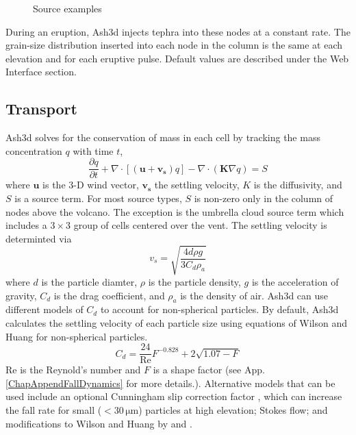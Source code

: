 \begin{figure}[htbp]
\parbox{15cm}{\caption{\label{FigSourceExample}
Source examples}}
\end{figure}

During an eruption, Ash3d injects tephra into these nodes at a constant
rate. The grain-size distribution inserted into each node in the column
is the same at each elevation and for each eruptive pulse. Default values
are described under the Web Interface section.

\subsection{Transport}\label{ChapIntroSecTrans}
Ash3d solves for the conservation of mass in each cell by tracking the mass
concentration $q$ with time $t$,
\begin{equation}\label{EqGovEqVect}
 \frac{\partial q}{\partial t} +
   \nabla \cdot \left[ \left(\mathbf{u} + \mathbf{v_s} \right) q \right]
 - \nabla \cdot \left( \mathbf{K} \nabla q\right) = S
\end{equation}
where $\mathbf{u}$ is the 3-D wind vector,
$\mathbf{v_s}$ the settling velocity, $K$ is the
diffusivity, and $S$ is a source term.  For most source types, $S$
is non-zero only in the column of nodes above the volcano.  The
exception is the umbrella cloud source term which includes a
$3 \times 3$ group of cells centered over the vent.
The settling velocity is determinted via \cite[p.182]{Bird60}
\begin{equation}
v_s=\sqrt{\frac{4d\rho g}{3C_d\rho_a}}\label{EqFallVel}
\end{equation}
where $d$ is the particle diamter, $\rho$ is the particle density, $g$ is
the acceleration of gravity, $C_d$ is the drag coefficient, and $\rho_a$
is the density of air.
Ash3d can use different models of $C_d$ to account for non-spherical particles.
By default, Ash3d calculates the settling
velocity of each particle size using equations of Wilson and Huang \cite{Wilson79}
for non-spherical particles.
\begin{equation}
C_d = \frac{24}{\mathrm{Re}}F^{-0.828}+2 \sqrt{1.07-F}\label{EqDragWH}
\end{equation}
$\mathrm{Re}$ is the Reynold's number and $F$ is a shape factor (see
App. \ref{ChapAppendFallDynamics} for more details.).
Alternative models that can be used include an
optional Cunningham slip correction factor \cite[p.407]{Seinfeld06},
which can increase the fall rate for small ($<30 \,\mathrm{\mu m}$)
particles at high elevation;
Stokes flow; and modifications to Wilson and Huang by \cite{Ganser93} and
\cite{Pfeiffer05}.

